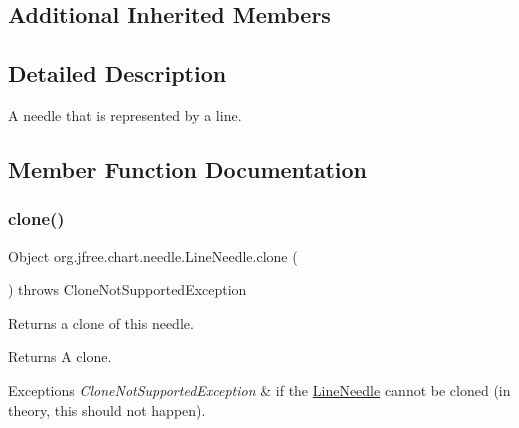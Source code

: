 \subsection*{Additional Inherited Members}


\subsection{Detailed Description}
A needle that is represented by a line. 

\subsection{Member Function Documentation}
\mbox{\label{classorg_1_1jfree_1_1chart_1_1needle_1_1_line_needle_aef624b61294dd6616a115ce74667be1f}} 
\subsubsection{\texorpdfstring{clone()}{clone()}}
{\footnotesize\ttfamily Object org.\+jfree.\+chart.\+needle.\+Line\+Needle.\+clone (\begin{DoxyParamCaption}{ }\end{DoxyParamCaption}) throws Clone\+Not\+Supported\+Exception}

Returns a clone of this needle.

\begin{DoxyReturn}{Returns}
A clone.
\end{DoxyReturn}

\begin{DoxyExceptions}{Exceptions}
{\em Clone\+Not\+Supported\+Exception} & if the {\ttfamily \mbox{\hyperlink{classorg_1_1jfree_1_1chart_1_1needle_1_1_line_needle}{Line\+Needle}}} cannot be cloned (in theory, this should not happen). \\
\hline
\end{DoxyExceptions}
\mbox{\label{classorg_1_1jfree_1_1chart_1_1needle_1_1_line_needle_a8ef6a2ef7a4b0cd99c4ffc569f4fb238}} 
